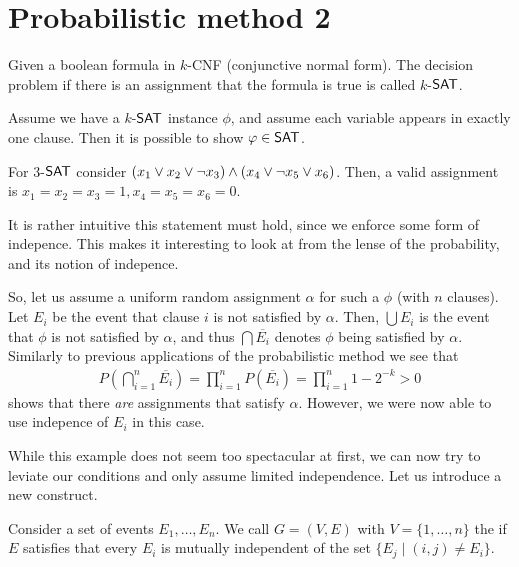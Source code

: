
\section{Probabilistic method 2}
\begin{definition}
    Given a boolean formula in $k$-CNF (conjunctive normal form).
    The decision problem if there is an assignment that the formula is true is called $k$-$\mathsf{SAT}$.
\end{definition}
Assume we have a $k$-$\mathsf{SAT}$ instance $\phi$, and assume each variable appears in exactly one clause.
Then it is possible to show $\phi \in \SAT$.
\begin{example}
    For $3$-$\mathsf{SAT}$ consider $(x_1 \vee x_2 \vee \neg x_3) \wedge (x_4 \vee \neg x_5 \vee x_6)$.
    Then, a valid assignment is $x_1 = x_2 = x_3 = 1, x_4=x_5=x_6=0$.
\end{example}
It is rather intuitive this statement must hold, since we enforce some form of indepence.
This makes it interesting to look at from the lense of the probability, and its notion of indepence.

So, let us assume a uniform random assignment $\alpha$ for such a $\phi$ (with $n$ clauses).
Let $E_i$ be the event that clause $i$ is not satisfied by $\alpha$.
Then, $\bigcup E_i$ is the event that $\phi$ is not satisfied by $\alpha$, and thus
$\bigcap \overline{E_i}$ denotes $\phi$ being satisfied by $\alpha$.
Similarly to previous applications of the probabilistic method we see that
\begin{align}
    P\left(\bigcap_{i=1}^n \overline{E_i}\right) = \prod_{i=1}^n P(\overline{E_i}) = \prod_{i=1}^{n}1 - 2^{-k} > 0
\end{align}
shows that there \emph{are} assignments that satisfy $\alpha$.
However, we were now able to use indepence of $E_i$ in this case.

While this example does not seem too spectacular at first, we can now try to leviate our conditions
and only assume limited independence.
Let us introduce a new construct.
\begin{definition}
    Consider a set of events $E_1, \dots, E_n$.
    We call $G = (V,E)$ with $V= \{1, \dots, n\}$ the  if $E$ satisfies that
    every $E_i$ is mutually independent of the set $\{E_j \mid (i,j) \neq E_i \}$.
\end{definition}

